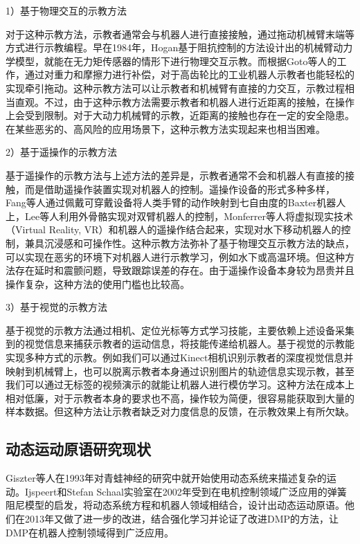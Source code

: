 1）基于物理交互的示教方法

对于这种示教方法，示教者通常会与机器人进行直接接触，通过拖动机械臂末端等方式进行示教编程。早在1984年，Hogan基于阻抗控制的方法设计出的机械臂动力学模型，就能在无力矩传感器的情形下进行物理交互示教\cite{Hogan1984a}。而根据Goto等人的工作，通过对重力和摩擦力进行补偿，对于高齿轮比的工业机器人示教者也能轻松的实现牵引拖动\cite{Goto2002}。这种示教方法可以让示教者和机械臂有直接的力交互，示教过程相当直观。不过，由于这种示教方法需要示教者和机器人进行近距离的接触，在操作上会受到限制。对于大动力机械臂的示教，近距离的接触也存在一定的安全隐患\cite{Li2021}。在某些恶劣的、高风险的应用场景下，这种示教方法实现起来也相当困难。

2）基于遥操作的示教方法

基于遥操作的示教方法与上述方法的差异是，示教者通常不会和机器人有直接的接触，而是借助遥操作装置实现对机器人的控制。遥操作设备的形式多种多样，Fang等人通过佩戴可穿戴设备将人类手臂的动作映射到七自由度的Baxter机器人上\cite{Fang2019a}，Lee等人利用外骨骼实现对双臂机器人的控制\cite{Lee2014}，Monferrer等人将虚拟现实技术（Virtual Reality, VR）和机器人的遥操作结合起来，实现对水下移动机器人的控制，兼具沉浸感和可操作性\cite{Monferrer2002}。这种示教方法弥补了基于物理交互示教方法的缺点，可以实现在恶劣的环境下对机器人进行示教学习，例如水下或高温环境。但这种方法存在延时和震颤问题\cite{Yang2017}，导致跟踪误差的存在。由于遥操作设备本身较为昂贵并且操作复杂，这种方法的使用门槛也比较高\cite{Li2022}。

3）基于视觉的示教方法

基于视觉的示教方法通过相机、定位光标等方式学习技能，主要依赖上述设备采集到的视觉信息来捕获示教者的运动信息，将技能传递给机器人。基于视觉的示教能实现多种方式的示教。例如我们可以通过Kinect相机识别示教者的深度视觉信息并映射到机械臂上\cite{Xu2018b}，也可以脱离示教者本身通过识别图片的轨迹信息实现示教\cite{Li2021}，甚至我们可以通过无标签的视频演示的就能让机器人进行模仿学习\cite{Sermanet2018}。这种方法在成本上相对低廉，对于示教者本身的要求也不高，操作较为简便，很容易能获取到大量的样本数据。但这种方法让示教者缺乏对力度信息的反馈，在示教效果上有所欠缺。

\subsection{动态运动原语研究现状}
Giszter等人在1993年对青蛙神经的研究中就开始使用动态系统来描述复杂的运动\cite{Giszter1993b}。Ijspeert和Stefan Schaal实验室在2002年受到在电机控制领域广泛应用的弹簧阻尼模型的启发，将动态系统方程和机器人领域相结合，设计出动态运动原语\cite{Ijspeert2002}。他们在2013年又做了进一步的改进，结合强化学习并论证了改进DMP的方法，让DMP在机器人控制领域得到广泛应用\cite{Ijspeert2013}。

